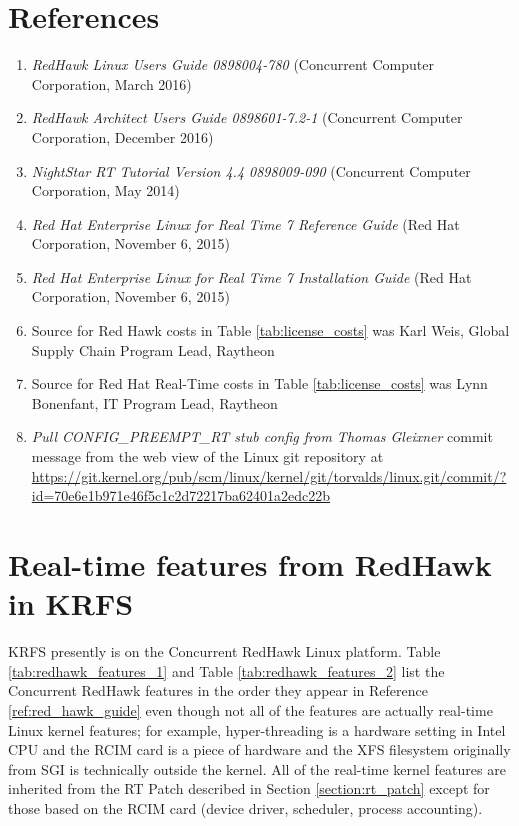 \documentclass[12pt]{article}
\begin{document}
%
\newpage
\section{References}

\begin{enumerate}
    \item \textit{RedHawk Linux Users Guide 0898004-780} (Concurrent Computer Corporation, March 2016) \label{ref:red_hawk_guide}
    \item \textit{RedHawk Architect Users Guide 0898601-7.2-1} (Concurrent Computer Corporation, December 2016) \label{ref:architect}
    \item \textit{NightStar RT Tutorial Version 4.4 0898009-090} (Concurrent Computer Corporation, May 2014) \label{ref:nightstar}
    \item \textit{Red Hat Enterprise Linux for Real Time 7 Reference Guide} (Red Hat Corporation, November 6, 2015) \label{ref:rhel7_ref}
    \item \textit{Red Hat Enterprise Linux for Real Time 7 Installation Guide} (Red Hat Corporation, November 6, 2015) \label{ref:rhel7_install}
    \item Source for Red Hawk costs in Table \ref{tab:license_costs} was Karl Weis, Global Supply Chain Program Lead, Raytheon \label{ref:karl}
    \item Source for Red Hat Real-Time costs in Table \ref{tab:license_costs} was Lynn Bonenfant, IT Program Lead, Raytheon \label{ref:lynn}
    \item \textit{Pull CONFIG\_PREEMPT\_RT stub config from Thomas Gleixner} commit message from the web view of the Linux git repository at \url{https://git.kernel.org/pub/scm/linux/kernel/git/torvalds/linux.git/commit/?id=70e6e1b971e46f5c1c2d72217ba62401a2edc22b} \label{ref:commit}
\end{enumerate}


%
\newpage
\section{Real-time features from RedHawk in KRFS}
\label{sec:redhawk_features}

KRFS presently is on the Concurrent RedHawk Linux platform. Table
\ref{tab:redhawk_features_1} and Table \ref{tab:redhawk_features_2} list the
Concurrent RedHawk features in the order they appear in Reference
\ref{ref:red_hawk_guide} even though not all of the features are actually
real-time Linux kernel features; for example, hyper-threading is a hardware
setting in Intel CPU and the RCIM card is a piece of hardware and the XFS
filesystem originally from SGI is technically outside the kernel.  All of the
real-time kernel features are inherited from the RT Patch described in Section
\ref{section:rt_patch} except for those based on the RCIM card (device driver,
scheduler, process accounting).
\end{document}
